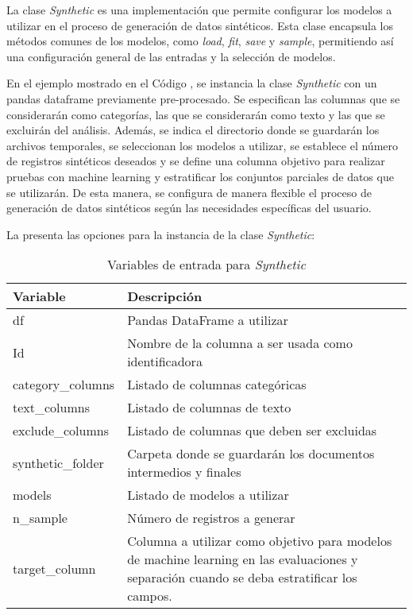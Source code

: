 La clase \emph{Synthetic} es una implementación que permite configurar los modelos a utilizar en el proceso de generación de datos sintéticos. Esta clase encapsula los métodos comunes de los modelos, como \emph{load}, \emph{fit}, \emph{save} y \emph{sample}, permitiendo así una configuración general de las entradas y la selección de modelos.

En el ejemplo mostrado en el Código , se instancia la clase \emph{Synthetic} con un pandas dataframe previamente pre-procesado. Se especifican las columnas que se considerarán como categorías, las que se considerarán como texto y las que se excluirán del análisis. Además, se indica el directorio donde se guardarán los archivos temporales, se seleccionan los modelos a utilizar, se establece el número de registros sintéticos deseados y se define una columna objetivo para realizar pruebas con machine learning y estratificar los conjuntos parciales de datos que se utilizarán. De esta manera, se configura de manera flexible el proceso de generación de datos sintéticos según las necesidades específicas del usuario.

La  presenta las opciones para la instancia de la clase \emph{Synthetic}:

\begin{table}[H]
\centering
\caption{Variables de entrada para \emph{Synthetic}}
\label{synthetic-input}
\begin{tabular}{|l|m{25em}|}
\hline
\rowcolor[gray]{0.8}
\textbf{Variable} & \textbf{Descripción} \\
\hline
df & Pandas DataFrame a utilizar \\
\hline
Id & Nombre de la columna a ser usada como identificadora \\
\hline
category\_columns & Listado de columnas categóricas \\
\hline
text\_columns & Listado de columnas de texto \\
\hline
exclude\_columns & Listado de columnas que deben ser excluidas \\
\hline
synthetic\_folder & Carpeta donde se guardarán los documentos intermedios y finales \\
\hline
models & Listado de modelos a utilizar \\
\hline
n\_sample & Número de registros a generar \\
\hline
target\_column & Columna a utilizar como objetivo para modelos de machine learning en las evaluaciones y separación cuando se deba estratificar los campos. \\
\hline
\end{tabular}
\end{table}

